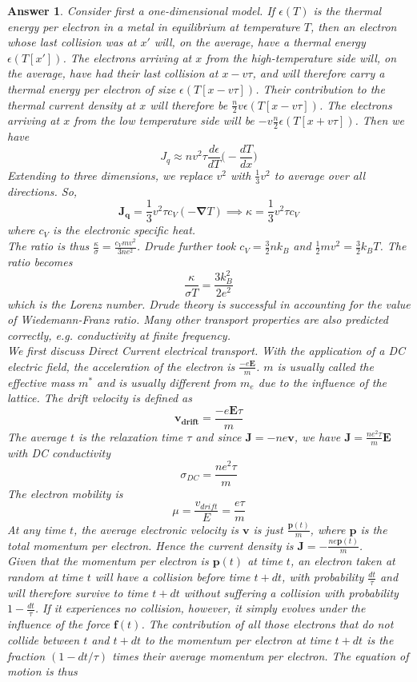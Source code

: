 \documentclass[a4paper]{article}
\newtheorem{ans}{Answer}[subsection]
\theoremstyle{new}
\begin{document}
\begin{ans}
Consider first a one-dimensional model. If $\epsilon(T)$ is the thermal energy per electron in a metal in equilibrium at temperature $T$, then an electron whose last collision was at $x'$ will, on the average, have a thermal energy $\epsilon(T[x'])$. The electrons arriving at $x$ from the high-temperature side will, on the average, have had their last collision at $x-v\tau$, and will therefore carry a thermal energy per electron of size $\epsilon(T[x-v\tau])$. Their contribution to the thermal current density at $x$ will therefore be $\frac{n}{2}v\epsilon(T[x-v\tau])$. The electrons arriving at $x$ from the low temperature side will be $-v\frac{n}{2}\epsilon(T[x+v\tau])$. Then we have 
$$J_q\approx nv^2\tau\frac{d\epsilon}{dT}\bigg(-\frac{dT}{dx}\bigg)$$
Extending to three dimensions, we replace $v^2$ with $\frac{1}{3}v^2$ to average over all directions. So,
$$\mathbf{J_q}=\frac{1}{3}v^2\tau c_V(-\boldsymbol{\nabla}T)\implies\kappa=\frac{1}{3}v^2\tau c_V$$
where $c_V$ is the electronic specific heat.\\[5pt]
The ratio is thus $\frac{\kappa}{\sigma}=\frac{c_Vmv^2}{3ne^2}$. Drude further took $c_V=\frac{3}{2}nk_B$ and $\frac{1}{2}mv^2=\frac{3}{2}k_BT$. The ratio becomes
$$\frac{\kappa}{\sigma T}=\frac{3k_B^2}{2e^2}$$
which is the Lorenz number. Drude theory is successful in accounting for the value of Wiedemann-Franz ratio. Many other transport properties are also predicted correctly, e.g. conductivity at finite frequency.\\[5pt]
We first discuss Direct Current electrical transport. With the application of a DC electric field, the acceleration of the electron is $\frac{-e\mathbf{E}}{m}$. $m$ is usually called the effective mass $m^*$ and is usually different from $m_e$ due to the influence of the lattice. The drift velocity is defined as
$$\mathbf{v_{drift}}=\frac{-e\mathbf{E}\tau}{m}$$
The average $t$ is the relaxation time $\tau$ and since $\mathbf{J}=-ne\mathbf{v}$, we have $\mathbf{J}=\frac{ne^2\tau}{m}\mathbf{E}$ with DC conductivity
$$\sigma_{DC}=\frac{ne^2\tau}{m}$$
The electron mobility is
$$\mu=\frac{v_{drift}}{E}=\frac{e\tau}{m}$$
At any time $t$, the average electronic velocity is $\mathbf{v}$ is just $\frac{\mathbf{p}(t)}{m}$, where $\mathbf{p}$ is the total momentum per electron. Hence the current density is $\mathbf{J}=-\frac{ne\mathbf{p}(t)}{m}$.\\[5pt]
Given that the momentum per electron is $\mathbf{p}(t)$ at time $t$, an electron taken at random at time $t$ will have a collision before time $t+dt$, with probability $\frac{dt}{\tau}$ and will therefore survive to time $t+dt$ without suffering a collision with probability $1-\frac{dt}{\tau}$. If it experiences no collision, however, it simply evolves under the influence of the force $\textbf{f}(t)$. The contribution of all those electrons that do not collide between $t$ and $t+dt$ to the momentum per electron at time $t+dt$ is the fraction $(1-dt/\tau)$ times their average momentum per electron. The equation of motion is thus

\end{ans}
\end{document}
